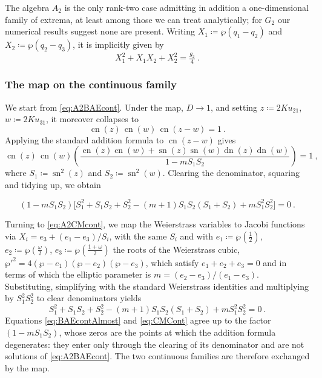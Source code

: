 \documentclass[aps, prx, nofootinbib, twocolumn,amsfonts,amsmath,amssymb,mathtools,superscriptaddress,preprintnumbers,floatfix,reprint]{revtex4-2}
\DeclareMathOperator{\sn}{sn}
\DeclareMathOperator{\cn}{cn}
\DeclareMathOperator{\dn}{dn}
\begin{document}
The algebra $A_2$ is the only rank-two case admitting in addition a
one-dimensional family of extrema, at least among those we can treat
analytically; for $G_2$ our numerical results suggest none are present.
Writing $X_1\coloneqq\wp(q_1-q_2)$ and $X_2\coloneqq\wp(q_2-q_3)$, it is implicitly
given by \
\begin{equation}\label{eq:A2CMcont}
  X_1^2+X_1X_2+X_2^2=\tfrac{g_2}{4}\ .
\end{equation}

\subsubsection{The map on the continuous family}
\label{subsub:A2ContApp}

We start from \eqref{eq:A2BAEcont}. Under the map, $D\to1$, and setting
$z\coloneqq2Ku_{21}$, $w\coloneqq2Ku_{31}$, it moreover collapses to
\begin{equation}
  \cn(z)\,\cn(w)\,\cn(z-w)=1\ .
\end{equation}
Applying the standard addition formula to $\cn(z-w)$ gives
{\small
\begin{equation}
  \cn(z)\,\cn(w)\left(
  \frac{\cn(z)\cn(w)+\sn(z)\sn(w)\dn(z)\dn(w)}{1-mS_1S_2}\right)=1\ ,
\end{equation}}%
where $S_1\coloneqq\sn^2(z)$ and $S_2\coloneqq\sn^2(w)$. Clearing the
denominator, squaring and tidying up, we obtain
\begin{widetext}
\begin{equation}\label{eq:BAEcontAlmost}
  (1-mS_1S_2)\Big[S_1^2+S_1S_2+S_2^2-(m+1)S_1S_2(S_1+S_2)+mS_1^2S_2^2\Big]=0\ .
\end{equation}
\end{widetext}
Turning to \eqref{eq:A2CMcont}, we map the Weierstrass variables to Jacobi
functions via $X_i=e_3+(e_1-e_3)/S_i$, with the same $S_i$ and with
$e_1\coloneqq \wp(\tfrac12)$, $e_2\coloneqq \wp(\tfrac{\omega}{2})$,
$e_3\coloneqq \wp(\tfrac{1+\omega}{2})$ the roots of the Weierstrass cubic,
$\wp'^2=4(\wp-e_1)(\wp-e_2)(\wp-e_3)$, which satisfy $e_1+e_2+e_3=0$ and in
terms of which the elliptic parameter is $m=(e_2-e_3)/(e_1-e_3)$. Substituting,
simplifying with the standard Weierstrass identities and multiplying by
$S_1^2S_2^2$ to clear denominators yields
\begin{equation}\label{eq:CMCont}
  S_1^2+S_1S_2+S_2^2-(m+1)S_1S_2(S_1+S_2)+mS_1^2S_2^2=0\ .
\end{equation}
Equations \eqref{eq:BAEcontAlmost} and \eqref{eq:CMCont} agree up to the factor
$(1-mS_1S_2)$, whose zeros are the points at which the addition formula
degenerates: they enter only through the clearing of its denominator and are
not solutions of \eqref{eq:A2BAEcont}. The two continuous families are
therefore exchanged by the map.
\end{document}
